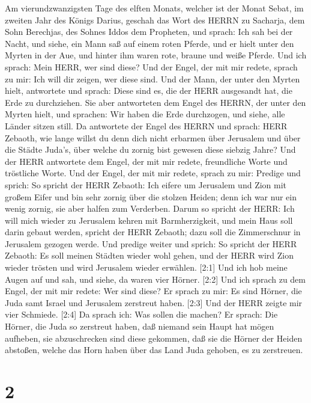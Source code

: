  Am vierundzwanzigsten Tage des elften Monats, welcher ist
der Monat Sebat, im zweiten Jahr des Königs Darius, geschah das Wort des
HERRN zu Sacharja, dem Sohn Berechjas, des Sohnes Iddos dem Propheten,
und sprach:  Ich sah bei der Nacht, und siehe, ein Mann saß
auf einem roten Pferde, und er hielt unter den Myrten in der Aue, und
hinter ihm waren rote, braune und weiße Pferde.  Und ich
sprach: Mein HERR, wer sind diese? Und der Engel, der mit mir redete,
sprach zu mir: Ich will dir zeigen, wer diese sind.  Und
der Mann, der unter den Myrten hielt, antwortete und sprach: Diese sind
es, die der HERR ausgesandt hat, die Erde zu durchziehen. 
Sie aber antworteten dem Engel des HERRN, der unter den Myrten hielt,
und sprachen: Wir haben die Erde durchzogen, und siehe, alle Länder
sitzen still.  Da antwortete der Engel des HERRN und
sprach: HERR Zebaoth, wie lange willst du denn dich nicht erbarmen über
Jerusalem und über die Städte Juda's, über welche du zornig bist gewesen
diese siebzig Jahre?  Und der HERR antwortete dem Engel,
der mit mir redete, freundliche Worte und tröstliche Worte.
 Und der Engel, der mit mir redete, sprach zu mir: Predige
und sprich: So spricht der HERR Zebaoth: Ich eifere um Jerusalem und
Zion mit großem Eifer  und bin sehr zornig über die stolzen
Heiden; denn ich war nur ein wenig zornig, sie aber halfen zum
Verderben.  Darum so spricht der HERR: Ich will mich wieder
zu Jerusalem kehren mit Barmherzigkeit, und mein Haus soll darin gebaut
werden, spricht der HERR Zebaoth; dazu soll die Zimmerschnur in
Jerusalem gezogen werde.  Und predige weiter und sprich: So
spricht der HERR Zebaoth: Es soll meinen Städten wieder wohl gehen, und
der HERR wird Zion wieder trösten und wird Jerusalem wieder erwählen.
 {[}2:1{]} Und ich hob meine Augen auf und sah, und siehe,
da waren vier Hörner.  {[}2:2{]} Und ich sprach zu dem
Engel, der mit mir redete: Wer sind diese? Er sprach zu mir: Es sind
Hörner, die Juda samt Israel und Jerusalem zerstreut haben.
 {[}2:3{]} Und der HERR zeigte mir vier Schmiede.
 {[}2:4{]} Da sprach ich: Was sollen die machen? Er sprach:
Die Hörner, die Juda so zerstreut haben, daß niemand sein Haupt hat
mögen aufheben, sie abzuschrecken sind diese gekommen, daß sie die
Hörner der Heiden abstoßen, welche das Horn haben über das Land Juda
gehoben, es zu zerstreuen.

\hypertarget{section-1}{%
\section{2}\label{section-1}}

